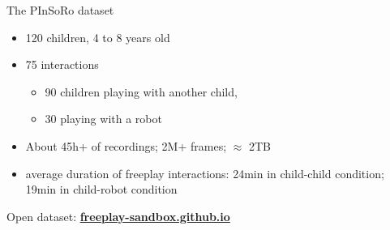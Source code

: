 \documentclass[compress]{beamer}
\begin{document}
%
%
%
%
%


\begin{frame}{The PInSoRo dataset}
    \begin{itemize}
        \item 120 children, 4 to 8 years old
        \item 75 interactions
            \begin{itemize}
                \item 90 children playing with another child, 
                \item 30 playing with a robot
            \end{itemize}
        \item About 45h+ of recordings; 2M+ frames; $\approx$ 2TB
         \item average duration of freeplay interactions: 24min in child-child
         condition; 19min in child-robot condition
    \end{itemize}

    \begin{center}
        Open dataset: \href{https://freeplay-sandbox.github.io}{\bf freeplay-sandbox.github.io}
    \end{center}
\end{frame}
%
%
%
\end{document}
